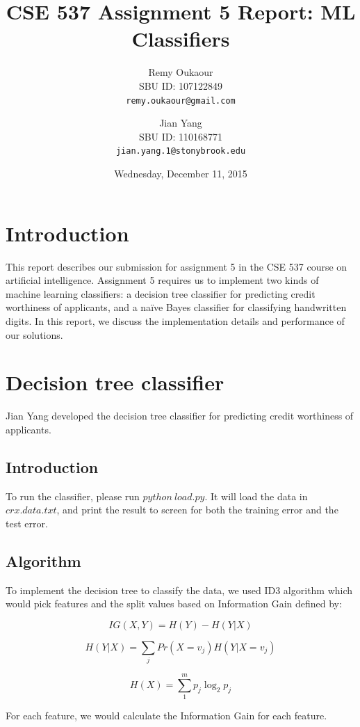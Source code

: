 \documentclass[11pt]{article}
\title{CSE 537 Assignment 5 Report: ML Classifiers}
\author{
Remy Oukaour \\
	{\small SBU ID: 107122849}\\
	{\small \texttt{remy.oukaour@gmail.com}}
\and
Jian Yang \\
	{\small SBU ID: 110168771}\\
	{\small \texttt{jian.yang.1@stonybrook.edu}}
}
\date{Wednesday, December 11, 2015}
\begin{document}
\maketitle

\section{Introduction}

This report describes our submission for assignment 5 in the CSE 537 course on
artificial intelligence. Assignment 5 requires us to implement two kinds of
machine learning classifiers: a decision tree classifier for predicting credit
worthiness of applicants, and a na{\"i}ve Bayes classifier for classifying
handwritten digits. In this report, we discuss the implementation details and
performance of our solutions.

\section{Decision tree classifier}

Jian Yang developed the decision tree classifier for predicting credit worthiness
of applicants.

\subsection{Introduction}
To run the classifier, please run $python\ load.py$. It will load the data in $crx.data.txt$,
and print the result to screen for both the training error and the test error.

\subsection{Algorithm}

To implement the decision tree to classify the data, we used  ID3 algorithm which would pick features
and the split values based on Information Gain defined by:

$$IG(X,Y) = H(Y) - H(Y|X)$$

$$H(Y|X) = \sum_jPr(X=v_j)H(Y|X=v_j)$$

$$H(X) = \sum_{1}^m p_j \log_2{p_j} $$

For each feature, we would calculate the Information Gain for each feature. \\
\end{document}
